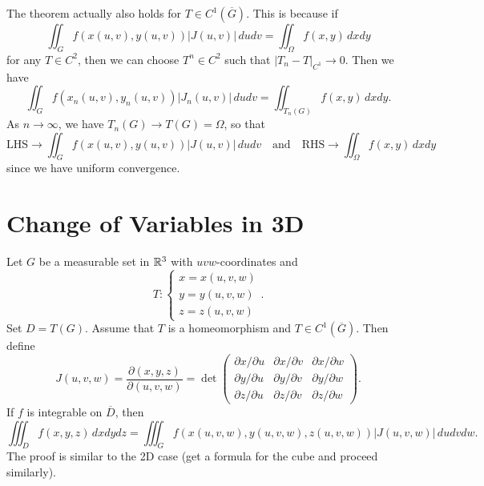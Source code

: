 \begin{remark}
  The theorem actually also holds for $T \in C^1(\overline{G})$.
  This is because if
  \[
    \iint_{G} f(x(u, v), y(u, v)) |J(u, v)|\, dudv
    = \iint_{\Omega} f(x, y)\, dxdy
  \]
  for any $T \in C^2$, then we can choose $T^n \in C^2$
  such that $|T_n - T|_{C^1} \to 0$. Then we have
  \[
    \iint_G f(x_n(u, v), y_n(u, v)) |J_n(u, v)|\, dudv
    = \iint_{T_n(G)} f(x, y)\, dxdy.
  \]
  As $n \to \infty$, we have $T_n(G) \to T(G) = \Omega$,
  so that
  \[
    \text{LHS} \to \iint_G f(x(u, v), y(u, v)) |J(u, v)|\, dudv
    \quad \text{and} \quad
    \text{RHS} \to  \iint_{\Omega} f(x, y)\, dxdy
  \]
  since we have uniform convergence.
\end{remark}

\section{Change of Variables in 3D}

Let $G$ be a measurable set in $\mathbb{R}^3$ with $uvw$-coordinates
and
\[
  T :
  \begin{cases}
    x = x(u, v, w) \\
    y = y(u, v, w) \\
    z = z(u, v, w)
  \end{cases}.
\]
Set $D = T(G)$. Assume that $T$ is a homeomorphism and
$T \in C^1(\overline{G})$. Then define
\[
  J(u, v, w) = \frac{\partial(x, y, z)}{\partial(u, v, w)}
  = \det
  \begin{pmatrix}
    \partial x / \partial u & \partial x / \partial v & \partial x / \partial w \\
    \partial y / \partial u & \partial y / \partial v & \partial y / \partial w \\
    \partial z / \partial u & \partial z / \partial v & \partial z / \partial w
  \end{pmatrix}.
\]
If $f$ is integrable on $\overline{D}$, then
\[
  \iiint_D f(x, y, z)\, dxdydz
  = \iiint_G f(x(u, v, w), y(u, v, w), z(u, v, w)) |J(u, v, w)|\, dudvdw.
\]
The proof is similar to the 2D case (get a formula for
the cube and proceed similarly).
